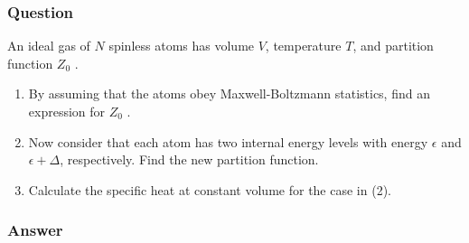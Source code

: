 \subsubsection{Question}
An ideal gas of $N$ spinless atoms has volume $V$, temperature $T$, and partition function $Z_0$ .
\begin{enumerate}
	\item By assuming that the atoms obey Maxwell-Boltzmann statistics, find an expression for $Z_0$ .
	\item Now consider that each atom has two internal energy levels with energy $\epsilon$ and $\epsilon+\Delta$, respectively. Find the new partition function.
	\item Calculate the specific heat at constant volume for the case in (2).
\end{enumerate}

\subsubsection{Answer}

